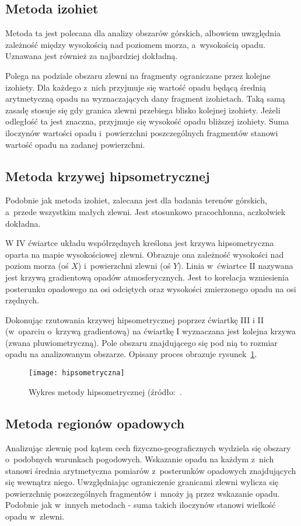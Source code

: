 \subsection{Metoda izohiet}
Metoda ta jest polecana dla analizy obszarów górskich, albowiem uwzględnia zależność między wysokością nad poziomem morza, a~wysokością opadu. Uznawana jest również za najbardziej dokładną.

Polega na podziale obszaru zlewni na fragmenty ograniczane przez kolejne izohiety. Dla każdego z~nich przyjmuje się wartość opadu będącą średnią arytmetyczną opadu na wyznaczających dany fragment izohietach. Taką samą zasadę stosuje się gdy granica zlewni przebiega blisko kolejnej izohiety. Jeżeli odległość ta jest znaczna, przyjmuje się wysokość opadu bliższej izohiety. Suma iloczynów wartości opadu i~powierzchni poszczególnych fragmentów stanowi wartość opadu na zadanej powierzchni.


\subsection{Metoda krzywej hipsometrycznej}
Podobnie jak metoda izohiet, zalecana jest dla badania terenów górskich, a~przede wszystkim małych zlewni. Jest stosunkowo pracochłonna, aczkolwiek dokładna.

W IV ćwiartce układu współrzędnych kreślona jest krzywa hipsometryczna oparta na mapie wysokościowej zlewni. Obrazuje ona zależność wysokości nad poziom morza (oś $X$) i~powierzchni zlewni (oś $Y$). Linia w~ćwiartce II nazywana jest krzywą gradientową opadów atmosferycznych. Jest to korelacja wzniesienia posterunku opadowego na osi odciętych oraz wysokości zmierzonego opadu na osi rzędnych.

Dokonując rzutowania krzywej hipsometrycznej poprzez ćwiartkę III i II (w~oparciu o~krzywą gradientową) na ćwiartkę I wyznaczana jest kolejna krzywa (zwana pluwiometryczną). Pole obszaru znajdującego się pod nią to rozmiar opadu na analizowanym obszarze. Opisany proces obrazuje rysunek~\ref{fig:hipsometryczna}.

\begin{figure}[!ht]
\centering
\texttt{[image: hipsometryczna]}
\caption{Wykres metody hipsometrycznej (źródło:~\cite{obliczanie_opadu_sredniego}.}
\label{fig:hipsometryczna}
\end{figure}

\subsection{Metoda regionów opadowych}
Analizując zlewnię pod kątem cech fizyczno-geograficznych wydziela się obszary o~podobnych warunkach pogodowych. Wskazanie opadu na każdym z~nich stanowi średnia arytmetyczna pomiarów z~posterunków opadowych znajdujących się wewnątrz niego. Uwzględniając ograniczenie granicami zlewni wylicza się powierzchnię poszczególnych fragmentów i~mnoży ją przez wskazanie opadu. Podobnie jak w~innych metodach - suma takich iloczynów stanowi wielkość opadu w~zlewni.

